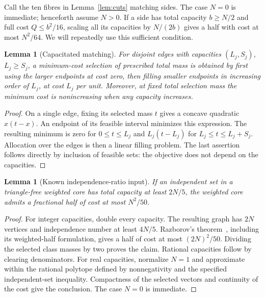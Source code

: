 \documentclass[11pt]{article}
\newtheorem{lemma}[theorem]{Lemma}
\begin{document}
Call the ten fibres in Lemma~\ref{lem:cuts} matching sides.
The case $N=0$ is immediate; henceforth assume $N>0$.
If a side has total capacity $b\geq N/2$ and full cost $Q\leq b^2/16$,
scaling all its capacities by $N/(2b)$ gives a half with cost at most
$N^2/64$. We will repeatedly use this sufficient condition.

\begin{lemma}[Capacitated matching]\label{lem:matching}
For disjoint edges with capacities $(L_j,S_j)$, $L_j\geq S_j$,
a minimum-cost selection of prescribed total mass is obtained by first
using the larger endpoints at cost zero, then filling smaller endpoints
in increasing order of $L_j$, at cost $L_j$ per unit.
Moreover, at fixed total selection mass the minimum cost is nonincreasing
when any capacity increases.
\end{lemma}
\begin{proof}
On a single edge, fixing its selected mass $t$ gives a concave quadratic
$x(t-x)$. An endpoint of its feasible interval minimizes this expression.
The resulting minimum is zero for $0\leq t\leq L_j$ and
$L_j(t-L_j)$ for $L_j\leq t\leq L_j+S_j$.
Allocation over the edges is then a linear filling problem.
The last assertion follows directly by inclusion of feasible sets:
the objective does not depend on the capacities.
\end{proof}

\begin{lemma}[Known independence-ratio input]\label{lem:alpha}
If an independent set in a triangle-free weighted core has total capacity
at least $2N/5$, the weighted core admits a fractional half of cost at most $N^2/50$.
\end{lemma}
\begin{proof}
For integer capacities, double every capacity. The resulting graph has
$2N$ vertices and independence number at least $4N/5$.
Razborov's theorem~\cite[Corollary 3.7]{R}, including its weighted-half
formulation, gives a half of cost at most $(2N)^2/50$.
Dividing the selected class masses by two proves the claim.
Rational capacities follow by clearing denominators.
For real capacities, normalize $N=1$ and approximate within the rational
polytope defined by nonnegativity and the specified independent-set
inequality. Compactness of the selected vectors and continuity of the
cost give the conclusion. The case $N=0$ is immediate.
\end{proof}
\end{document}
